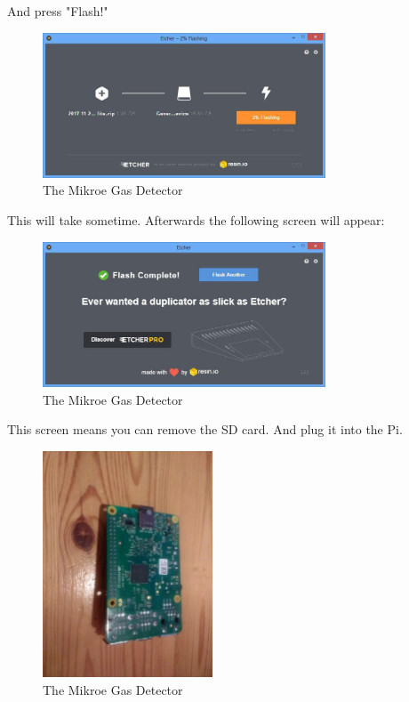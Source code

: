 \documentclass[11pt]{report}
\begin{document}
			\newpage
			And press "Flash!"
			\begin{figure}[ht]
				\centering
				\includegraphics[width=0.75\textwidth]{images/pi/install_etcher_5.jpg} 
				\caption{The Mikroe Gas Detector}
			\end{figure}
			This will take sometime. Afterwards the following screen will appear:
			\begin{figure}[ht]
				\centering
				\includegraphics[width=0.75\textwidth]{images/pi/install_etcher_6.jpg} 
				\caption{The Mikroe Gas Detector}
			\end{figure}
			This screen means you can remove the SD card.
			\newpage
			And plug it into the Pi.
			\begin{figure}[ht]
				\centering
				\includegraphics[width=0.45\textwidth]{images/pi/install_sd_1.jpg}
				\caption{The Mikroe Gas Detector}
			\end{figure}
\end{document}
